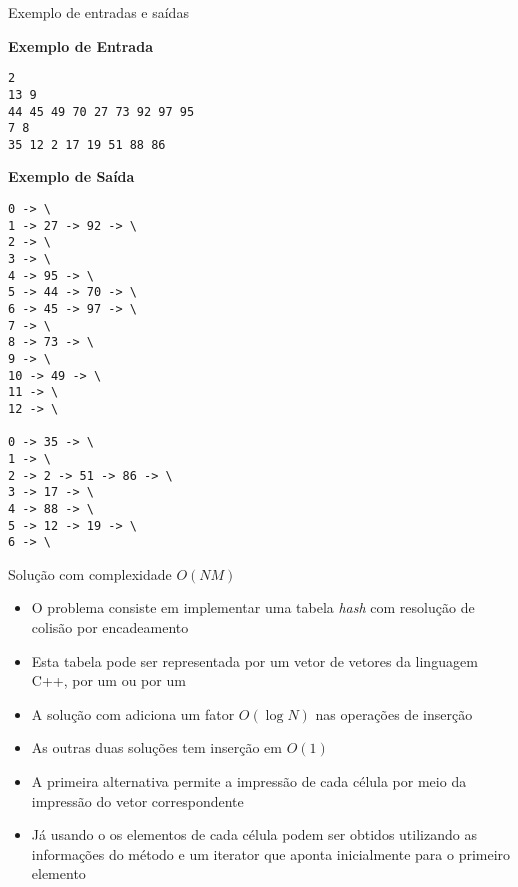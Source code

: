 \begin{frame}[fragile]{Exemplo de entradas e saídas}

\begin{scriptsize}
\begin{minipage}[t]{0.5\textwidth}
\textbf{Exemplo de Entrada}
\begin{verbatim}
2
13 9
44 45 49 70 27 73 92 97 95
7 8
35 12 2 17 19 51 88 86
\end{verbatim}
\end{minipage}
\begin{minipage}[t]{0.45\textwidth}
\textbf{Exemplo de Saída}
\begin{verbatim}
0 -> \
1 -> 27 -> 92 -> \
2 -> \
3 -> \
4 -> 95 -> \
5 -> 44 -> 70 -> \
6 -> 45 -> 97 -> \
7 -> \
8 -> 73 -> \
9 -> \
10 -> 49 -> \
11 -> \
12 -> \

0 -> 35 -> \
1 -> \
2 -> 2 -> 51 -> 86 -> \
3 -> 17 -> \
4 -> 88 -> \
5 -> 12 -> 19 -> \
6 -> \
\end{verbatim}
\end{minipage}
\end{scriptsize}

\end{frame}

\begin{frame}[fragile]{Solução com complexidade $O(NM)$}

    \begin{itemize}
        \item O problema consiste em implementar uma tabela \textit{hash} com resolução de
            colisão por encadeamento

        \item Esta tabela pode ser representada por um vetor de vetores da linguagem C++,
            por um  ou por um 

        \item A solução com  adiciona um fator $O(\log N)$ nas operações
            de inserção

        \item As outras duas soluções tem inserção em $O(1)$

        \item A primeira alternativa permite a impressão de cada célula por meio da impressão
            do vetor correspondente

        \item Já usando o  os elementos de cada célula podem
            ser obtidos utilizando as informações do método  e um
            iterator que aponta inicialmente para o primeiro elemento

   \end{itemize}

\end{frame}

